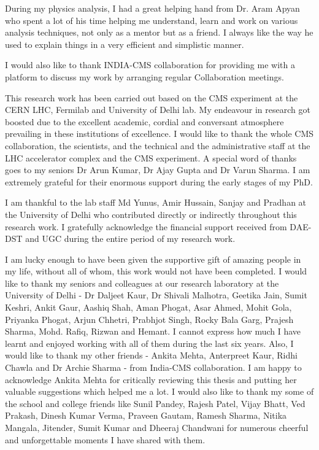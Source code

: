 During my physics analysis, I had a great helping hand from Dr. Aram Apyan who spent a lot of his time helping me understand, learn and work on various analysis techniques, not only as a mentor but as a friend. I always like the way he used to explain things in a very efficient and simplistic manner. 

I would also like to thank INDIA-CMS collaboration for providing me with a platform to discuss my work by arranging regular Collaboration meetings. 

This research work has been carried out based on the CMS experiment at the CERN LHC, Fermilab and University of Delhi lab. My endeavour in research got boosted due to the excellent academic, cordial and conversant atmosphere prevailing in these institutions of excellence. I would like to thank the whole CMS collaboration, the scientists, and the technical and the administrative staff at the LHC accelerator complex and the CMS experiment. A special word of thanks goes to my seniors Dr Arun Kumar, Dr Ajay Gupta and Dr Varun Sharma. I am extremely grateful for their enormous support during the early stages of my PhD.

I am thankful to the lab staff Md Yunus, Amir Hussain, Sanjay and Pradhan at the University of Delhi who contributed directly or indirectly throughout this research work. I gratefully acknowledge the financial support received from DAE-DST and UGC during the entire period of my research work.

I am lucky enough to have been given the supportive gift of amazing people in my life, without all of whom, this work would not have been completed. I would like to thank my seniors and colleagues at our research laboratory at the University of Delhi - Dr Daljeet Kaur, Dr Shivali Malhotra, Geetika Jain, Sumit Keshri, Ankit Gaur, Aashiq Shah, Aman Phogat, Asar Ahmed, Mohit Gola, Priyanka Phogat, Arjun Chhetri, Prabhjot Singh, Rocky Bala Garg, Prajesh Sharma, Mohd. Rafiq, Rizwan and Hemant. I cannot express how much I have learnt and enjoyed working with all of them during the last six years. Also, I would like to thank my other friends - Ankita Mehta, Anterpreet Kaur, Ridhi Chawla and Dr Archie Sharma - from India-CMS collaboration.
I am happy to acknowledge Ankita Mehta for critically reviewing this thesis and putting her valuable suggestions which helped me a lot. 
I would also like to thank my some of the school and college friends like Sunil Pandey, Rajesh Patel, Vijay Bhatt, Ved Prakash, Dinesh Kumar Verma, Praveen Gautam, Ramesh Sharma, Nitika Mangala, Jitender, Sumit Kumar and Dheeraj Chandwani for numerous cheerful and unforgettable moments I have shared with them.

